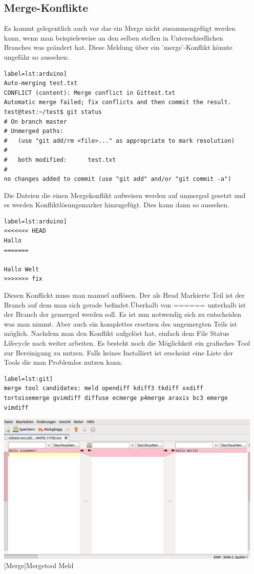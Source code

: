 \documentclass[12pt,a4paper,bibliography=totocnumbered,listof=totocnumbered]{scrartcl}
\begin{document}
\subsection{Merge-Konflikte}
Es kommt gelegentlich auch vor das ein Merge nicht zusammengefügt werden kann, wenn man beispielsweise an den selben stellen in Unterschiedlichen Branches was geändert hat.	
Diese Meldung über ein 'merge'-Konflikt könnte ungefähr so aussehen:
\begin{lstlisting}[caption=Branch Konfilkt] label=lst:arduino]
Auto-merging test.txt
CONFLICT (content): Merge conflict in Gittest.txt
Automatic merge failed; fix conflicts and then commit the result.
test@test:~/test$ git status
# On branch master
# Unmerged paths:
#   (use "git add/rm <file>..." as appropriate to mark resolution)
#
#	both modified:      test.txt
#
no changes added to commit (use "git add" and/or "git commit -a")
\end{lstlisting}

Die Dateien die einen Mergekonflikt aufweisen werden auf unmerged gesetzt und es werden Konfliktlösungsmarker hinzugefügt. Dies kann dann so aussehen.  	
\begin{lstlisting}[caption=Branch Konfilkt] label=lst:arduino]
<<<<<<< HEAD
Hallo
=======

Hallo Welt
>>>>>>> fix
\end{lstlisting}

Diesen Konflickt muss man manuel auflösen. Der als Head Markierte Teil ist der Branch auf dem man sich gerade befindet.Überhalb von ====== unterhalb ist der Branch der gemerged werden soll. Es ist nun notwendig sich zu entscheiden was man nimmt. Aber auch ein komplettes ersetzen des ungemergten Teils ist möglich. Nachdem man den Konflikt aufgelöst hat, einfach dem File Status Lifecycle nach weiter arbeiten.
Es besteht noch die Möglichkeit ein grafisches Tool zur Bereinigung zu nutzen. Falls keines Installiert ist erscheint eine Liste der Tools die man Problemlos nutzen kann.
\begin{lstlisting}[caption=Merge Tools] label=lst:git]
merge tool candidates: meld opendiff kdiff3 tkdiff xxdiff tortoisemerge gvimdiff diffuse ecmerge p4merge araxis bc3 emerge vimdiff
\end{lstlisting}

\vspace{1em}
\begin{minipage}{\linewidth}
	\centering
	\includegraphics[width=0.6\linewidth]{Bilder/mergetool.png}
	[Merge]{Mergetool Meld\footnotemark }
	\label{fig:gitspeichern}
\end{minipage}
\end{document}
